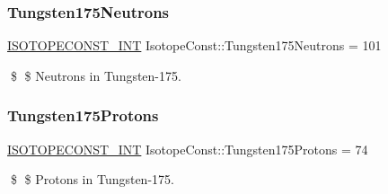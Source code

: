 \subsubsection{\texorpdfstring{Tungsten175\+Neutrons}{Tungsten175Neutrons}}
{\footnotesize\ttfamily \mbox{\hyperlink{group___isotope_const-_macros_ga5f18360b3e99483a35c32d789e62621c}{I\+S\+O\+T\+O\+P\+E\+C\+O\+N\+S\+T\+\_\+\+I\+NT}} Isotope\+Const\+::\+Tungsten175\+Neutrons = 101}

\$ \$ Neutrons in Tungsten-\/175. \mbox{\label{group___isotope_const-_tungsten-_w175_ga99829e6beaac61a3c1d786e7ef6c5155}} 
\subsubsection{\texorpdfstring{Tungsten175\+Protons}{Tungsten175Protons}}
{\footnotesize\ttfamily \mbox{\hyperlink{group___isotope_const-_macros_ga5f18360b3e99483a35c32d789e62621c}{I\+S\+O\+T\+O\+P\+E\+C\+O\+N\+S\+T\+\_\+\+I\+NT}} Isotope\+Const\+::\+Tungsten175\+Protons = 74}

\$ \$ Protons in Tungsten-\/175. 